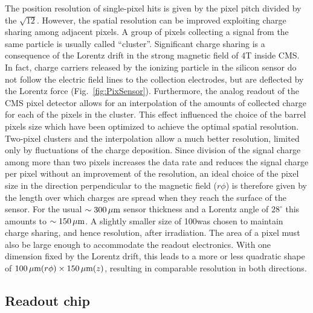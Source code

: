 The position resolution of single-pixel hits is given by the pixel pitch divided by the $\sqrt{12}$.
However, the spatial resolution can be improved exploiting charge sharing among adjacent pixels. A group of pixels collecting a signal from the same particle is usually called ``cluster''.
Significant charge sharing is a consequence of the Lorentz drift in the strong magnetic field of 4\unit{T} inside CMS.
In fact, charge carriers released by the ionizing particle in the silicon sensor do not follow the electric field lines to the collection electrodes, but are deflected by the Lorentz force (Fig.~\ref{fig:PixSensor}).
Furthermore, the analog readout of the CMS pixel detector allows for an interpolation of the amounts of collected charge for each of the pixels in the cluster.
This effect influenced the choice of the barrel pixels size which have been optimized to achieve the optimal spatial resolution.
Two-pixel clusters and the interpolation allow a much better resolution, limited only by fluctuations of the charge deposition.
Since division of the signal charge among more than two pixels increases the data rate and reduces the signal charge per pixel without an improvement of the resolution, an ideal choice of the pixel size in the direction perpendicular to the magnetic field ($r\phi$) is therefore given by the length over which charges are spread when they reach the surface of the sensor.
For the usual $\sim300\,\mu\text{m}$ sensor thickness and a Lorentz angle of $28^\circ$ this amounts to $\sim150\,\mu\text{m}$.
A slightly smaller size of 100\mum was chosen to maintain charge sharing, and hence resolution, after irradiation.
The area of a pixel must also be large enough to accommodate the readout electronics.
With one dimension fixed by the Lorentz drift, this leads to a more or less quadratic shape of $100\,\mu\text{m}(r\phi)\times150\,\mu\text{m}(z)$, resulting in comparable resolution in both directions.

\subsection{Readout chip}\label{subsec:BPix_ROC}

